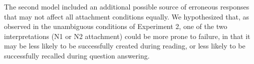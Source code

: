 \documentclass[11pt]{article}\usepackage[]{graphicx}\usepackage[]{color}
\begin{document}
The second model included an additional possible source of erroneous responses that may not affect all attachment conditions equally. 
We hypothesized that, as observed in the unambiguous conditions of Experiment 2, one of the two interpretations (N1 or N2 attachment) could be more prone to failure, in that it may be less likely to be successfully created during reading, or less likely to be successfully recalled during question answering. 
\end{document}
